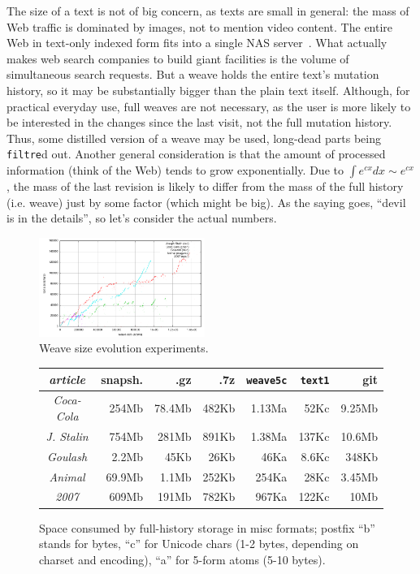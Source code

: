 \documentclass{sig-alternate}
\begin{document}
The size of a text is not of big concern, as texts are small in general: the mass of Web traffic is dominated by images, not to mention video content.
The entire Web in text-only indexed form fits into a single NAS server~\cite{own-experience}. What actually makes web search companies to build giant facilities is the volume of simultaneous search requests.
But a weave holds the entire text's mutation history, so it may be substantially bigger than the plain text itself.
Although, for practical everyday use, full weaves are not necessary, as the user is more likely to be interested in the changes since the last visit, not the full mutation history.
Thus, some distilled version of a weave may be used, long-dead parts being {\tt filtre}d out.
Another general consideration is that the amount of processed information (think of the Web) tends to grow exponentially. Due to $\int e^{cx}dx \sim e^{cx}$, the mass of the last revision is likely to differ from the mass of the full history (i.e. weave) just by some factor (which might be big).
As the saying goes, ``devil is in the details'', so let's consider the actual numbers.

\begin{figure} 
\includegraphics[width=0.48\textwidth]{weave-growth.pdf}
\caption{Weave size evolution experiments.} \label{fig:weave}
\end{figure}
\begin{figure} 
\resizebox{0.48\textwidth}{!} {
\begin{tabular}{|c|r|r|r|r|r|r|}
\hline
\em article & snapsh. & .gz & .7z & {\tt weave5c} & {\tt text1} & git \\
\hline
\em Coca-Cola& 254Mb &78.4Mb & 482Kb & 1.13Ma & 52Kc & 9.25Mb\\
\em J. Stalin&754Mb& 281Mb&891Kb& 1.38Ma&137Kc& 10.6Mb\\
\em Goulash&2.2Mb&45Kb&26Kb&46Ka&8.6Kc& 348Kb\\
\em Animal & 69.9Mb & 1.1Mb & 252Kb & 254Ka & 28Kc & 3.45Mb\\
\em 2007 & 609Mb & 191Mb & 782Kb & 967Ka & 122Kc & 10Mb\\
\hline
\end{tabular}
}
\caption{Space consumed by full-history storage in misc formats; postfix ``b'' stands for bytes, ``c'' for Unicode chars (1-2 bytes, depending on charset and encoding), ``a'' for 5-form atoms (5-10 bytes).} \label{fig:sizes} %
\end{figure}
\end{document}
